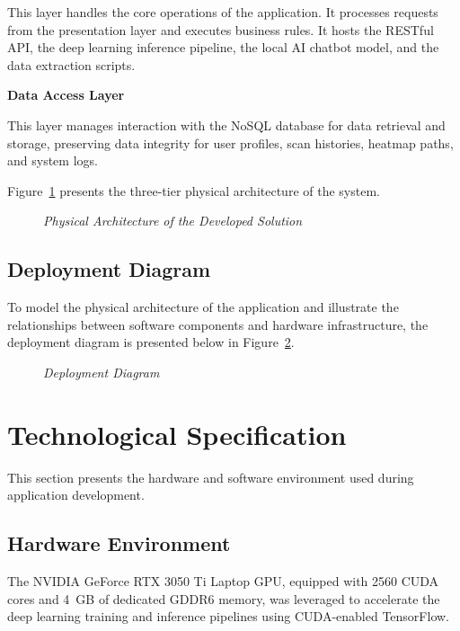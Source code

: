 This layer handles the core operations of the application. It processes requests from the presentation layer and executes business rules. It hosts the RESTful API, the deep learning inference pipeline, the local AI chatbot model, and the data extraction scripts.

\textbf{Data Access Layer}

This layer manages interaction with the NoSQL database for data retrieval and storage, preserving data integrity for user profiles, scan histories, heatmap paths, and system logs.

Figure~\ref{fig:physical_arch} presents the three-tier physical architecture of the system.

\begin{figure}[H]
	\centering
	\caption{\textit{Physical Architecture of the Developed Solution}}
	\label{fig:physical_arch}
\end{figure}

\subsection{Deployment Diagram}
To model the physical architecture of the application and illustrate the relationships between software components and hardware infrastructure, the deployment diagram is presented below in Figure~\ref{fig:deployment_diag}.

\begin{figure}[H]
	\centering
	\caption{\textit{Deployment Diagram}}
	\label{fig:deployment_diag}
\end{figure}

\section{Technological Specification}
This section presents the hardware and software environment used during
application development.

\subsection{Hardware Environment}
The NVIDIA GeForce RTX 3050 Ti Laptop GPU, equipped with 2560 CUDA cores and 4~GB of dedicated GDDR6 memory, was leveraged to accelerate the deep learning training and inference pipelines using CUDA-enabled TensorFlow.

